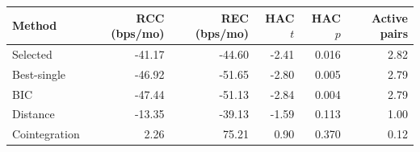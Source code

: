 \begin{tabular}{@{}lrrrrr@{}}
\toprule
Method & RCC (bps/mo) & REC (bps/mo) & HAC $t$ & HAC $p$ & Active pairs \\
\midrule
Selected & -41.17 & -44.60 & -2.41 & 0.016 & 2.82 \\
Best-single & -46.92 & -51.65 & -2.80 & 0.005 & 2.79 \\
BIC & -47.44 & -51.13 & -2.84 & 0.004 & 2.79 \\
Distance & -13.35 & -39.13 & -1.59 & 0.113 & 1.00 \\
Cointegration & 2.26 & 75.21 & 0.90 & 0.370 & 0.12 \\
\bottomrule
\end{tabular}
